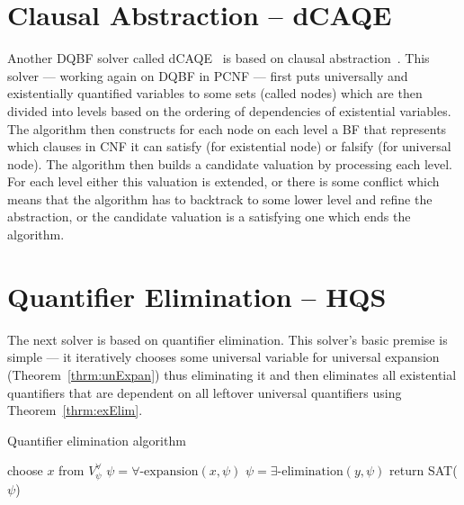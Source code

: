 \documentclass[
  digital, %
  color,
  twoside, %
  table,   %
  nolof,     %
  nolot,     %
]{fithesis3}
\theoremstyle{definition}
\theoremstyle{remark}
\newcommand{\evars}[1]{V_{#1}^{\exists}}
\newcommand{\uvars}[1]{V_{#1}^{\forall}}
\begin{document}
\section{Clausal Abstraction -- dCAQE}
Another DQBF solver called dCAQE~\cite{dCAQE} is based on clausal abstraction~\cite{ClausalAbstr}. This solver --- working again on DQBF in PCNF --- first puts universally and existentially quantified variables to some sets (called nodes) which are then divided into levels based on the ordering of dependencies of existential variables. The algorithm then constructs for each node on each level a BF that represents which clauses in CNF it can satisfy (for existential node) or falsify (for universal node). The algorithm then builds a candidate valuation by processing each level. For each level either this valuation is extended, or there is some conflict which means that the algorithm has to backtrack to some lower level and refine the abstraction, or the candidate valuation is a satisfying one which ends the algorithm.

\section{Quantifier Elimination -- HQS}
\label{sec:HQS}
The next solver is based on quantifier elimination. This solver's basic premise is simple --- it iteratively chooses some universal variable for universal expansion (Theorem~\ref{thrm:unExpan}) thus eliminating it and then eliminates all existential quantifiers that are dependent on all leftover universal quantifiers using Theorem~\ref{thrm:exElim}.

\begin{algorithm}
\caption{Quantifier elimination algorithm}
\label{alg:QE}
\begin{algorithmic}[1]
\While{$\uvars{\psi}$ is not empty}%
    \State choose $x$ from $\uvars{\psi}$
    \State $\psi = \forall\text{-expansion}(x,\psi)$ %
    \ForAll{$y \in \evars{\psi}$ s. t. $D_y = \uvars{\psi}$} %
        \State $\psi = \exists\text{-elimination}(y,\psi)$ %
    \EndFor
\EndWhile
\State return SAT($\psi$)
\EndFunction
\end{algorithmic}
\end{algorithm}
\end{document}
